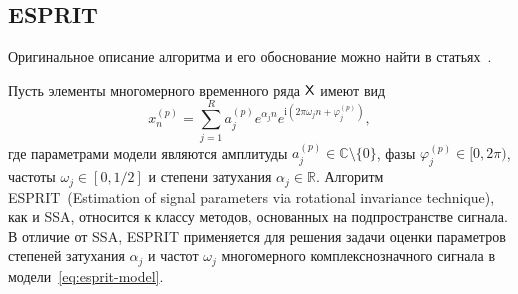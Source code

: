 \documentclass[specialist,
  substylefile=spbu_report.rtx,
subf,href,colorlinks=true, 12pt]{disser}
\theoremstyle{plain}
\theoremstyle{definition}
\theoremstyle{remark}
\newtheorem{remark}{Замечание}[section]
\newcommand{\iu}{\mathrm{i}}
\begin{document}
\subsection{ESPRIT}\label{subsec:esprit}
Оригинальное описание алгоритма и его обоснование
можно найти в статьях~\cite{esprit,hosvd-hooi-separation}.

Пусть элементы многомерного временного ряда $\mathsf{X}$ имеют вид
\begin{equation}
  \label{eq:esprit-model}
  x_n^{(p)} = \sum_{j=1}^{R} a_j^{(p)} e^{ \alpha_j n }
  e^{\iu \left( 2 \pi \omega_j n + \varphi_j^{(p)}\right)},
\end{equation}
где параметрами модели являются амплитуды
$a_j^{(p)} \in \mathbb{C}\setminus\{0\}$, фазы ${\varphi_j^{(p)} \in
[0, 2\pi)}$,
частоты $\omega_j\in [0, 1/2]$ и степени затухания $\alpha_j \in \mathbb{R}$.
Алгоритм ESPRIT~(Estimation of signal parameters via rotational
invariance tech\-nique),
как и SSA, относится к классу методов, основанных на подпространстве сигнала.
В отличие от SSA, ESPRIT применяется для решения задачи оценки параметров
степеней затухания $\alpha_j$ и частот $\omega_j$ многомерного
комплекснозначного сигнала в модели~\eqref{eq:esprit-model}.
\end{document}
